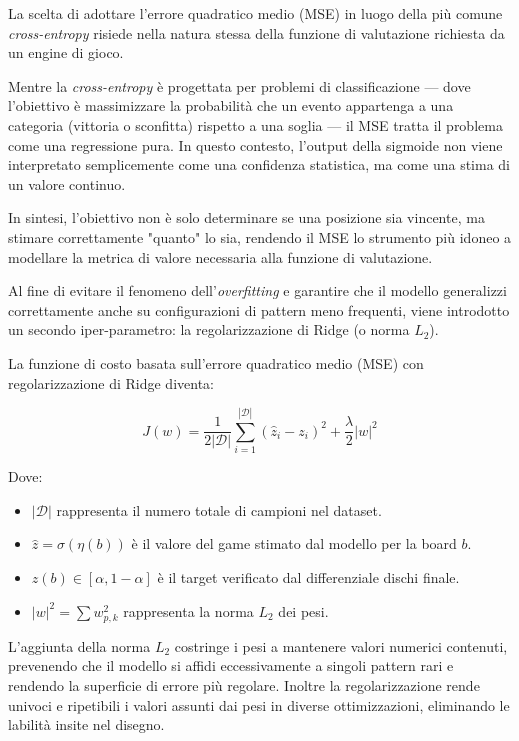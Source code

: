 La scelta di adottare l'errore quadratico medio (MSE) in luogo della più comune \textit{cross-entropy} risiede nella natura stessa della funzione di valutazione richiesta da un engine di gioco. 

Mentre la \textit{cross-entropy} è progettata per problemi di classificazione — dove l'obiettivo è massimizzare la probabilità che un evento appartenga a una categoria (vittoria o sconfitta) rispetto a una soglia — il MSE tratta il problema come una regressione pura.
In questo contesto, l'output della sigmoide non viene interpretato semplicemente come una confidenza statistica, ma come una stima di un valore continuo. 

In sintesi, l'obiettivo non è solo determinare se una posizione sia vincente, ma stimare correttamente "quanto" lo sia, rendendo il MSE lo strumento più idoneo a modellare la metrica di valore necessaria alla funzione di valutazione.

Al fine di evitare il fenomeno dell'\textit{overfitting} e garantire che il modello generalizzi correttamente anche su configurazioni di pattern meno frequenti, viene introdotto un secondo iper-parametro: la regolarizzazione di Ridge (o norma $L_2$).

La funzione di costo basata sull'errore quadratico medio (MSE) con regolarizzazione di Ridge diventa:

\begin{equation}
    J(w) = \frac{1}{2|\mathcal{D}|} \sum_{i=1}^{|\mathcal{D}|} (\hat{z}_i - z_i)^2 + \frac{\lambda}{2} |w|^2
\end{equation}

Dove:
\begin{itemize}
    \item $|\mathcal{D}|$ rappresenta il numero totale di campioni nel dataset.
    \item $\hat{z} = \sigma(\eta(b))$ è il valore del game stimato dal modello per la board $b$.
    \item $z(b) \in [\alpha, 1-\alpha]$ è il target verificato dal differenziale dischi finale.
    \item $|w|^2 = \sum w_{p,k}^2$ rappresenta la norma $L_2$ dei pesi.
\end{itemize}

L'aggiunta della norma $L_2$ costringe i pesi a mantenere valori numerici contenuti, prevenendo che il modello si affidi eccessivamente a singoli pattern rari e rendendo la superficie di errore più regolare.
Inoltre la regolarizzazione rende univoci e ripetibili i valori assunti dai pesi in diverse ottimizzazioni, eliminando le labilità insite nel disegno.

